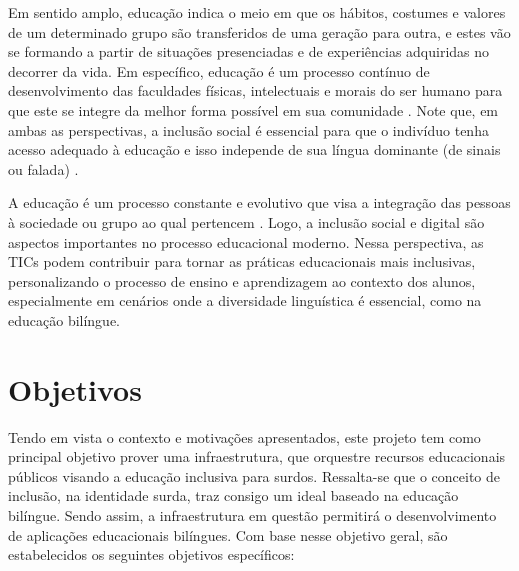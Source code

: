 Em sentido amplo, educação indica o meio em que os hábitos, costumes e valores de um determinado grupo são transferidos de uma geração para outra, e estes vão se formando a partir de situações presenciadas e de experiências adquiridas no decorrer da vida. Em específico, educação é um processo contínuo de desenvolvimento das faculdades físicas, intelectuais e morais do ser humano para que este se integre da melhor forma possível em sua comunidade \cite{Cilli2017,Quadros2019}. Note que, em ambas as perspectivas, a inclusão social é essencial para que o indivíduo tenha acesso adequado à educação e isso independe de sua língua dominante (de sinais ou falada) \cite{Quadros2019}. 

A educação é um processo constante e evolutivo que visa a integração das pessoas à sociedade ou grupo ao qual pertencem \cite{Cilli2017,Quadros2019}. Logo, a inclusão social e digital são aspectos importantes no processo educacional moderno. Nessa perspectiva, as TICs podem contribuir para tornar as práticas educacionais mais inclusivas, personalizando o processo de ensino e aprendizagem ao contexto dos alunos, especialmente em cenários onde a diversidade linguística é essencial, como na educação bilíngue.

\section{Objetivos}

Tendo em vista o contexto e motivações apresentados, este projeto tem como principal objetivo prover uma infraestrutura, que orquestre recursos educacionais públicos visando a educação inclusiva para surdos. Ressalta-se que o conceito de inclusão, na identidade surda, traz consigo um ideal baseado na educação bilíngue. Sendo assim, a infraestrutura em questão permitirá o desenvolvimento de aplicações educacionais bilíngues. %
Com base nesse objetivo geral, são estabelecidos os seguintes objetivos específicos:

